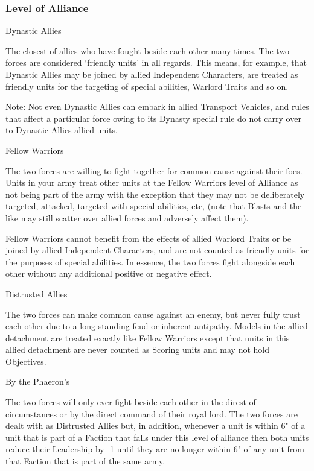 \subsubsection{Level of Alliance}

\noindent
\yellowskull Dynastic Allies

The closest of allies who have fought beside each other many times. The two forces are considered ‘friendly units’ in all regards. This means, for example, that Dynastic Allies may be joined by allied Independent Characters, are treated as friendly units for the targeting of special abilities, Warlord Traits and so on.

Note: Not even Dynastic Allies can embark in allied Transport Vehicles, and rules that affect a particular force owing to its Dynasty special rule do not carry over to Dynastic Allies allied units.

\noindent
\blackskull Fellow Warriors

The two forces are willing to fight together for common cause against their foes. Units in your army treat other units at the Fellow Warriors level of Alliance as not being part of the army with the exception that they may not be deliberately targeted, attacked, targeted with special abilities, etc, (note that Blasts and the like may still scatter over allied forces and adversely affect them).

Fellow Warriors cannot benefit from the effects of allied Warlord Traits or be joined by allied Independent Characters, and are not counted as friendly units for the purposes of special abilities. In essence, the two forces fight alongside each other without any additional positive or negative effect.

\noindent
\greyskull Distrusted Allies

The two forces can make common cause against an enemy, but never fully trust each other due to a long-standing feud or inherent antipathy. Models in the allied detachment are treated exactly like Fellow Warriors except that units in this allied detachment are never counted as Scoring units and may not hold Objectives.

\noindent
\redskull By the Phaeron's

The two forces will only ever fight beside each other in the direst of circumstances or by the direct command of their royal lord. The two forces are dealt with as Distrusted Allies but, in addition, whenever a unit is within 6" of a unit that is part of a Faction that falls under this level of alliance then both units reduce their Leadership by -1 until they are no longer within 6" of any unit from that Faction that is part of the same army.


